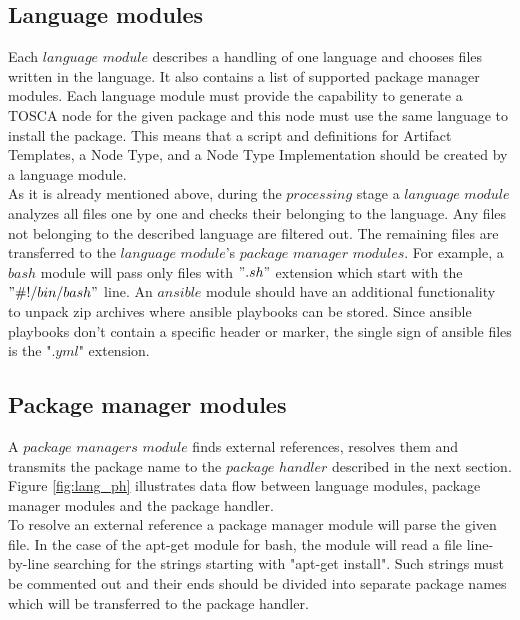 \subsection{Language modules} \label{subs:archlm}
Each $language$ $module$ describes a handling of one language and chooses files written in the language.
It also contains a list of supported package manager modules.
Each language module must provide the capability to generate a TOSCA node for the given package and this node must use the same language to install the package.
This means that a script and definitions for Artifact Templates, a Node Type, and a Node Type Implementation should be created by a language module.\\
As it is already mentioned above, during the $processing$ stage a $language$ $module$ analyzes all files one by one and checks their belonging to the language. 
Any files not belonging to the described language are filtered out.
The remaining files are transferred to the $language$ $module$'s $package$ $manager$ $modules$.
For example, a $bash$ module will pass only files with $".sh"$ extension which start with the $"\#!/bin/bash"$ line.
An $ansible$ module should have an additional functionality to unpack zip archives where ansible playbooks can be stored.
Since ansible playbooks don't contain a specific header or marker, the single sign of ansible files is the "$.yml$" extension. 

\subsection{Package manager modules} \label{subs:archpmm}
A $package$ $managers$ $module$ finds external references, resolves them and transmits the package name to the $package$ $handler$ described in the next section.
Figure \ref{fig:lang_ph} illustrates data flow between language modules, package manager modules and the package handler.\\
To resolve an external reference a package manager module will parse the given file. 
In the case of the apt-get module for bash, the module will read a file line-by-line searching for the strings starting with "apt-get install".
Such strings must be commented out and their ends should be divided into separate package names which will be transferred to the package handler. 


